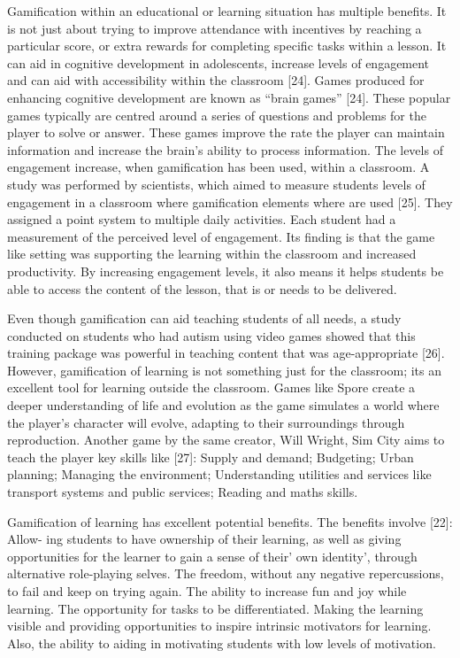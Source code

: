 \documentclass{sigchi}
\begin{document}
Gamification within an educational or learning situation has multiple benefits. It is not just about trying to improve attendance with incentives by reaching a particular score, or extra rewards for completing specific tasks within a lesson. It can aid in cognitive development in adolescents, increase levels of engagement and can aid with accessibility within the classroom [24]. Games produced for enhancing cognitive development are known as “brain games” [24]. These popular games typically are centred around a series of questions and problems for the player to solve or answer. These games improve the rate the player can maintain information and increase the brain’s ability to process information. The levels of engagement increase, when gamification has been used, within a classroom. A study was performed by scientists, which aimed to measure students levels of engagement in a classroom where gamification elements where are used [25]. They assigned a point system to multiple daily activities. Each student had a measurement of the perceived level of engagement. Its finding is that the game like setting was supporting the learning within the classroom and increased productivity. By increasing engagement levels, it also means it helps students be able to access the content of the lesson, that is or needs to be delivered. 

Even though gamification can aid teaching students of all needs, a study conducted on students who had autism using video games showed that this training package was powerful in teaching content that was age-appropriate [26]. However, gamification of learning is not something just for the classroom; its an excellent tool for learning outside the classroom. Games like Spore create a deeper understanding of life and evolution as the game simulates a world where the player’s character will evolve, adapting to their surroundings through reproduction. Another game by the same creator, Will Wright, Sim City aims to teach the player key skills like [27]: Supply and demand; Budgeting; Urban planning; Managing the environment; Understanding utilities and services like transport systems and public services; Reading and maths skills. 

Gamification of learning has excellent potential benefits. The benefits involve [22]: Allow- ing students to have ownership of their learning, as well as giving opportunities for the learner to gain a sense of their’ own identity’, through alternative role-playing selves. The freedom, without any negative repercussions, to fail and keep on trying again. The ability to increase fun and joy while learning. The opportunity for tasks to be differentiated. Making the learning visible and providing opportunities to inspire intrinsic motivators for learning. Also, the ability to aiding in motivating students with low levels of motivation. 
\end{document}
